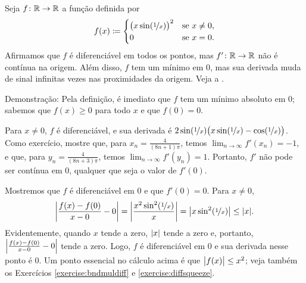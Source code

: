 \begin{example} \label{baddifffunc:example}
Seja $f \colon {\mathbb{R}} \to {\mathbb{R}}$ a função definida por
\begin{equation*}
f(x) \coloneqq
\begin{cases}
{\bigl( x \sin(\nicefrac{1}{x}) \bigr)}^2 & \text{se } x \neq 0, \\
0 & \text{se } x = 0.
\end{cases}
\end{equation*}
Afirmamos que $f$ é diferenciável em todos os pontos, mas $f' \colon {\mathbb{R}} \to {\mathbb{R}}$ não é contínua na origem. Além disso, $f$ tem um mínimo em $0$, mas sua derivada muda de sinal infinitas vezes nas proximidades da origem. Veja a .
\begin{myfigureht}
\caption{Uma função com derivada descontínua. A função $f$ está à esquerda e $f'$ à direita. Observe que $f(x) \leq x^2$ no gráfico da esquerda.\label{fig:nonc1diff}}
\end{myfigureht}

Demonstração: Pela definição, é imediato que $f$ tem um mínimo absoluto em $0$; sabemos que $f(x) \geq 0$ para todo $x$ e que $f(0)=0$.

Para $x \neq 0$, $f$ é diferenciável, e sua derivada é $2 \sin (\nicefrac{1}{x}) \bigl( x \sin (\nicefrac{1}{x}) - \cos(\nicefrac{1}{x}) \bigr)$. Como exercício, mostre que, para $x_n = \frac{4}{(8n+1)\pi}$, temos $\lim_{n\to\infty} f'(x_n) = -1$, e que, para $y_n = \frac{4}{(8n+3)\pi}$, temos $\lim_{n\to\infty} f'(y_n) = 1$. Portanto, $f'$ não pode ser contínua em $0$, qualquer que seja o valor de $f'(0)$.

Mostremos que $f$ é diferenciável em $0$ e que $f'(0)=0$.
Para $x \neq 0$,
\begin{equation*}
\left\lvert {\frac{f(x)-f(0)}{x-0} - 0} \right\rvert
=
\left\lvert {\frac{x^2 \sin^2(\nicefrac{1}{x})}{x}} \right\rvert
=
\bigl\lvert {x \sin^2(\nicefrac{1}{x})} \bigr\rvert
\leq
\lvert {x} \rvert .
\end{equation*}
Evidentemente, quando $x$ tende a zero, $\lvert {x} \rvert$ tende a zero e, portanto, $\left\lvert {\frac{f(x)-f(0)}{x-0} - 0} \right\rvert$ tende a zero. Logo, $f$ é diferenciável em $0$ e sua derivada nesse ponto é $0$. Um ponto essencial no cálculo acima é que $\bigl\lvert {f(x)} \bigr\rvert \leq x^2$; veja também os Exercícios \ref{exercise:bndmuldiff} e \ref{exercise:diffsqueeze}.
\end{example}

